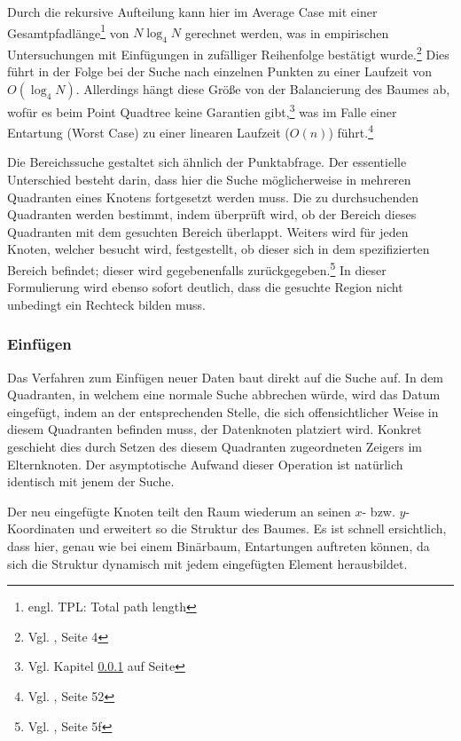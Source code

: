 \documentclass[%
			paper=a4,%
			DIV12,
			liststotoc,
			bibtotoc,
			draft=false,%
			titlepage
			]{scrartcl}
\newcommand{\zit}[3]{#1 \cite{#2}, #3}
\newcommand{\footzit}[3]{\footnote{\zit{#1}{#2}{#3}}}
\begin{document}
Durch die rekursive Aufteilung kann hier im Average Case mit einer  Gesamtpfadlänge\footnote{engl. TPL: Total path length} von $N \log_4 N$ gerechnet werden, was in empirischen Untersuchungen mit Einfügungen in zufälliger Reihenfolge bestätigt wurde.\footzit{Vgl.}{DBLP:journals/acta/FinkelB74}{Seite 4}
Dies führt in der Folge bei der Suche nach einzelnen Punkten zu einer Laufzeit von $O(\log_4 N)$.
Allerdings hängt diese Größe von der Balancierung des Baumes ab, wofür es beim Point Quadtree keine Garantien gibt,\footnote{Vgl. Kapitel \ref{sec:pointquadtree:insert} auf Seite \pageref{sec:pointquadtree:insert}}
was im Falle einer Entartung (Worst Case) zu einer linearen Laufzeit ($O(n)$) führt.\footzit{Vgl.}{Samet90}{Seite 52}

Die Bereichssuche gestaltet sich ähnlich der Punktabfrage.
Der essentielle Unterschied besteht darin, dass hier die Suche möglicherweise in mehreren Quadranten eines Knotens fortgesetzt werden muss.
Die zu durchsuchenden Quadranten werden bestimmt, indem überprüft wird, ob der Bereich dieses Quadranten mit dem gesuchten Bereich überlappt.
Weiters wird für jeden Knoten, welcher besucht wird, festgestellt, ob dieser sich in dem spezifizierten Bereich befindet; dieser wird gegebenenfalls zurückgegeben.\footzit{Vgl.}{DBLP:journals/acta/FinkelB74}{Seite 5f}
In dieser Formulierung wird ebenso sofort deutlich, dass die gesuchte Region nicht unbedingt ein Rechteck bilden muss.


\subsubsection{Einfügen}
\label{sec:pointquadtree:insert}
Das Verfahren zum Einfügen neuer Daten baut direkt auf die Suche auf.
In dem Quadranten, in welchem eine normale Suche abbrechen würde, wird das Datum eingefügt, indem an der entsprechenden Stelle, die sich offensichtlicher Weise in diesem Quadranten befinden muss, der Datenknoten platziert wird.
Konkret geschieht dies durch Setzen des diesem Quadranten zugeordneten Zeigers im Elternknoten.
Der asymptotische Aufwand dieser Operation ist natürlich identisch mit jenem der Suche.

Der neu eingefügte Knoten teilt den Raum wiederum an seinen $x$- bzw. $y$-Koordinaten und erweitert so die Struktur des Baumes.  
Es ist schnell ersichtlich, dass hier, genau wie bei einem Binärbaum, Entartungen auftreten können, da sich die Struktur dynamisch mit jedem eingefügten Element herausbildet.
\end{document}
